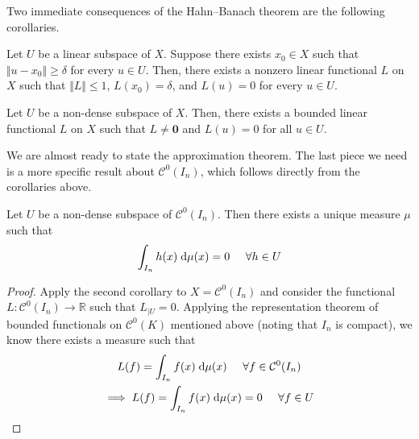 \documentclass{article}
\numberwithin{equation}{subsection}
\begin{document}
Two immediate consequences of the Hahn–Banach theorem are the following corollaries.

\begin{corollary}
Let $U$ be a linear subspace of $X$. Suppose there exists $x_0 \in X$ such that $\Vert u - x_0 \Vert \geq \delta$ for every $u \in U$. Then, there exists a nonzero linear functional $L$ on $X$ such that $\Vert L \Vert \leq 1$, $L(x_0) = \delta$, and $L(u) = 0$ for every $u \in U$.
\end{corollary}

\begin{corollary}
    Let $U$ be a non-dense subspace of $X$. Then, there exists a bounded linear functional $L$ on $X$ such that $L \neq \textbf{0}$ and $L(u) = 0$ for all $u \in U$.
\end{corollary}

We are almost ready to state the approximation theorem. The last piece we need is a more specific result about $\mathcal{C}^0(I_n)$, which follows directly from the corollaries above.

\begin{lemma}
    Let $U$ be a non-dense subspace of $\mathcal{C}^0(I_n)$. Then there exists a unique measure $\mu$ such that
    \begin{equation*}
        \int_{I_n} h(x) \;\text{d} \mu(x) = 0 \;\;\;\;\; \forall h \in U
    \end{equation*}
\end{lemma}
\begin{proof}
    Apply the second corollary to $X = \mathcal{C}^0(I_n)$ and consider the functional $L : \mathcal{C}^0(I_n) \to \mathbb{R}$ such that $L_{\vert U} = 0$. Applying the representation theorem of bounded functionals on $\mathcal{C}^0(K)$ mentioned above (noting that $I_n$ is compact), we know there exists a measure such that
    \begin{gather*}
        L(f) = \int_{I_n} f(x) \;\text{d} \mu(x) \;\;\;\;\; \forall f \in \mathcal{C}^0(I_n) \\
        \implies L(f) = \int_{I_n} f(x) \;\text{d} \mu(x) = 0 \;\;\;\;\; \forall f \in U
    \end{gather*}
\end{proof}
\end{document}

